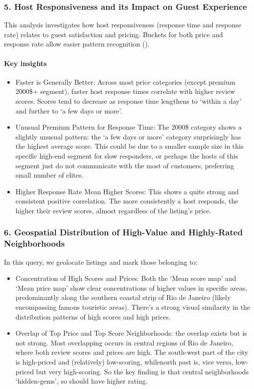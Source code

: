 \subsubsection*{5. Host Responsiveness and its Impact on Guest Experience}

This analysis investigates how host responsiveness (response time and response rate) relates to guest satisfaction and pricing. Buckets for both price and response rate allow easier pattern recognition ().

\vspace{0.5em}
\paragraph{Key insights}
\begin{itemize}
    \item Faster is Generally Better: Across most price categories (except premium 2000\$+ segment), faster host response times correlate with higher review scores. Scores tend to decrease as response time lengthens to `within a day' and further to `a few days or more'.
    \item Unusual Premium Pattern for Response Time: The 2000\$ category shows a slightly unusual pattern: the `a few days or more' category surprisingly has the highest average score. This could be due to a smaller sample size in this specific high-end segment for slow responders, or perhaps the hosts of this segment just do not communicate with the most of customers, preferring small number of elites.
    \item Higher Response Rate Mean Higher Scores: This shows a quite strong and consistent positive correlation. The more consistently a host responds, the higher their review scores, almost regardless of the listing's price.
\end{itemize}

\subsubsection*{6. Geospatial Distribution of High-Value and Highly-Rated Neighborhoods}

In this query, we geolocate listings and mark those belonging to:
\begin{itemize}
    \item Concentration of High Scores and Prices: Both the `Mean score map' and `Mean price map' show clear concentrations of higher values in specific areas, predominantly along the southern coastal strip of Rio de Janeiro (likely encompassing famous touristic areas). There's a strong visual similarity in the distribution patterns of high scores and high prices.
    \item Overlap of Top Price and Top Score Neighborhoods: the overlap exists but is not strong. Most overlapping occurs in central regions of Rio de Janeiro, where both review scores and prices are high. The south-west part of the city is high-priced and (relatively) low-scoring, whilenorth past is, vice versa, low-priced but very high-scoring. So the key finding is that central neighborhoods `hidden-gems', so should have higher rating.
\end{itemize}

